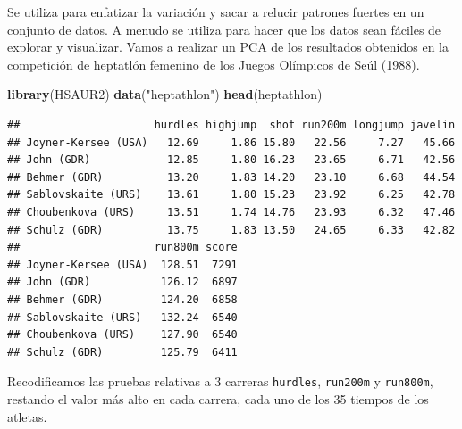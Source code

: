 \documentclass[]{book}
\newenvironment{Shaded}{\begin{snugshade}}{\end{snugshade}}
\newcommand{\KeywordTok}[1]{\textcolor[rgb]{0.13,0.29,0.53}{\textbf{#1}}}
\newcommand{\StringTok}[1]{\textcolor[rgb]{0.31,0.60,0.02}{#1}}
\newcommand{\OperatorTok}[1]{\textcolor[rgb]{0.81,0.36,0.00}{\textbf{#1}}}
\newcommand{\NormalTok}[1]{#1}
\begin{document}
Se utiliza para enfatizar la variación y sacar a relucir patrones
fuertes en un conjunto de datos. A menudo se utiliza para hacer que los
datos sean fáciles de explorar y visualizar. Vamos a realizar un PCA de
los resultados obtenidos en la competición de heptatlón femenino de los
Juegos Olímpicos de Seúl (1988).

\begin{Shaded}
\begin{Highlighting}[]
\KeywordTok{library}\NormalTok{(HSAUR2)}
\KeywordTok{data}\NormalTok{(}\StringTok{"heptathlon"}\NormalTok{)}
\KeywordTok{head}\NormalTok{(heptathlon)}
\end{Highlighting}
\end{Shaded}

\begin{verbatim}
##                     hurdles highjump  shot run200m longjump javelin
## Joyner-Kersee (USA)   12.69     1.86 15.80   22.56     7.27   45.66
## John (GDR)            12.85     1.80 16.23   23.65     6.71   42.56
## Behmer (GDR)          13.20     1.83 14.20   23.10     6.68   44.54
## Sablovskaite (URS)    13.61     1.80 15.23   23.92     6.25   42.78
## Choubenkova (URS)     13.51     1.74 14.76   23.93     6.32   47.46
## Schulz (GDR)          13.75     1.83 13.50   24.65     6.33   42.82
##                     run800m score
## Joyner-Kersee (USA)  128.51  7291
## John (GDR)           126.12  6897
## Behmer (GDR)         124.20  6858
## Sablovskaite (URS)   132.24  6540
## Choubenkova (URS)    127.90  6540
## Schulz (GDR)         125.79  6411
\end{verbatim}

Recodificamos las pruebas relativas a 3 carreras \texttt{hurdles},
\texttt{run200m} y \texttt{run800m}, restando el valor más alto en cada
carrera, cada uno de los 35 tiempos de los atletas.

\begin{Shaded}
\end{Shaded}
\end{document}
